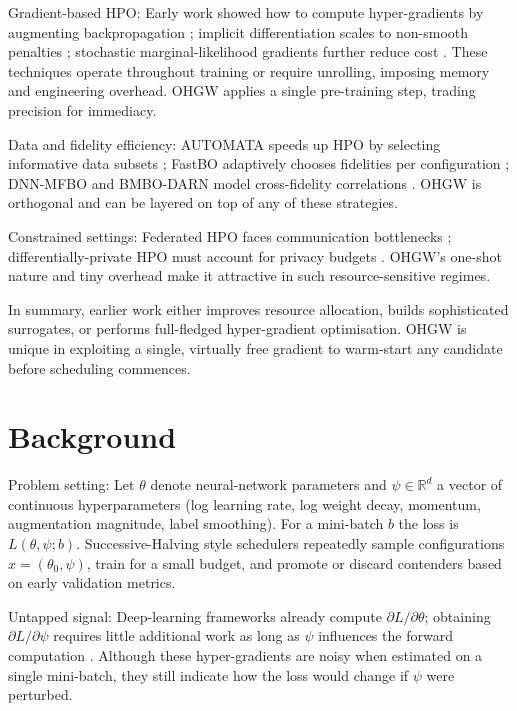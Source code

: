 \documentclass{article}
\begin{document}
Gradient-based HPO: Early work showed how to compute hyper-gradients by augmenting backpropagation \cite{chandra-2019-gradient}; implicit differentiation scales to non-smooth penalties \cite{bertrand-2020-implicit}; stochastic marginal-likelihood gradients further reduce cost \cite{immer-2023-stochastic}. These techniques operate throughout training or require unrolling, imposing memory and engineering overhead. OHGW applies a single pre-training step, trading precision for immediacy.

Data and fidelity efficiency: AUTOMATA speeds up HPO by selecting informative data subsets \cite{killamsetty-2022-automata}; FastBO adaptively chooses fidelities per configuration \cite{jiang-2024-efficient}; DNN-MFBO and BMBO-DARN model cross-fidelity correlations \cite{li-2020-multi,li-2021-batch}. OHGW is orthogonal and can be layered on top of any of these strategies.

Constrained settings: Federated HPO faces communication bottlenecks \cite{khodak-2021-federated}; differentially-private HPO must account for privacy budgets \cite{panda-2022-new,wang-2023-hypo}. OHGW's one-shot nature and tiny overhead make it attractive in such resource-sensitive regimes.

In summary, earlier work either improves resource allocation, builds sophisticated surrogates, or performs full-fledged hyper-gradient optimisation. OHGW is unique in exploiting a single, virtually free gradient to warm-start any candidate before scheduling commences.

\section{Background}
Problem setting: Let \(\theta\) denote neural-network parameters and \(\psi\in\mathbb{R}^d\) a vector of continuous hyperparameters (log learning rate, log weight decay, momentum, augmentation magnitude, label smoothing). For a mini-batch \(b\) the loss is \(L(\theta,\psi; b)\). Successive-Halving style schedulers repeatedly sample configurations \(x=(\theta_0,\psi)\), train for a small budget, and promote or discard contenders based on early validation metrics.

Untapped signal: Deep-learning frameworks already compute \(\partial L/\partial \theta\); obtaining \(\partial L/\partial \psi\) requires little additional work as long as \(\psi\) influences the forward computation \cite{chandra-2019-gradient}. Although these hyper-gradients are noisy when estimated on a single mini-batch, they still indicate how the loss would change if \(\psi\) were perturbed.
\end{document}
